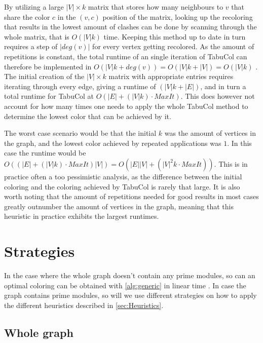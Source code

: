 \documentclass[a4paper]{article}
\begin{document}
By utilizing a large $|V| \times k$ matrix that stores how many neighbours to $v$ that share
the color $c$ in the $(v,c)$ position of the matrix, looking up the recoloring
that results in the lowest amount of clashes can be done by scanning through 
the whole matrix, that is $O(|V|k)$ time.
Keeping this method up to date in turn requires a step of $|deg(v)|$ for every
vertex getting recolored.  As the amount of repetitions is constant, the total
runtime of an single iteration of TabuCol can therefore be implemented in
$O(|V|k+deg(v)) = O(|V|k+|V|) = O(|V|k)$ \cite{Constructive}. The initial
creation of the $|V| \times k$ matrix with appropriate entries requires
iterating through every edge, giving a runtime of $(|V|k+|E|)$, and in turn a 
total runtime for TabuCol at $O(|E|+(|V|k)\cdot MaxIt)$. This does however
not account for how many times one needs to apply the whole TabuCol method to
determine the lowest color that can be achieved by it.

The worst case scenario would be that the initial $k$ was the amount of
vertices in the graph, and the lowest color achieved by repeated applications
was $1$. In this case the runtime would be $O((|E|+(|V|k)\cdot MaxIt)|V|) = O(
|E||V| + (|V|^2k\cdot MaxIt))$. This is in practice often a too
pessimistic analysis, as the difference between the initial coloring and the
coloring achieved by TabuCol is rarely that large. It is also worth noting that
the amount of repetitions needed for good results in most cases greatly
outnumber the amount of vertices in the graph, meaning that this heuristic in
practice exhibits the largest runtimes.

\section{Strategies}
\label{sec:Strategies}
In the case where the whole graph doesn't contain any prime modules, so can an optimal
coloring can be obtained with \autoref{alg:generic} in linear time
\cite{HCL}. In case the graph contains prime modules, so will we use different
strategies on how to apply the different heuristics described in \autoref{sec:Heuristics}.

\subsection{Whole graph}
\end{document}
